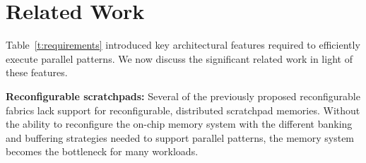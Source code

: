\section{Related Work}
\label{relatedWork}



%
Table~\ref{t:requirements} introduced key architectural features required to efficiently execute parallel patterns.
We now discuss the significant related work in light of these features.

{\bf Reconfigurable scratchpads:} Several of the previously proposed reconfigurable fabrics lack support for reconfigurable, distributed scratchpad memories.  Without the ability to reconfigure the on-chip memory system with the different banking and buffering strategies needed to support parallel patterns, the memory system becomes the bottleneck for many workloads.

